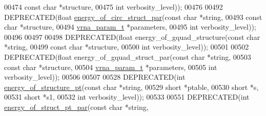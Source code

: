 \begin{DoxyCode}
00474                                           \textcolor{keyword}{const} \textcolor{keywordtype}{char}  *structure,
00475                                           \textcolor{keywordtype}{int}         verbosity\_level));
00476 
00492 DEPRECATED(\textcolor{keywordtype}{float} \hyperlink{group__eval_ga3f01f9744ba6a40555eb4d81fc77f6df}{energy\_of\_circ\_struct\_par}(\textcolor{keyword}{const} \textcolor{keywordtype}{char}   *\textcolor{keywordtype}{string},
00493                                            \textcolor{keyword}{const} \textcolor{keywordtype}{char}   *structure,
00494                                            \hyperlink{group__energy__parameters_structvrna__param__s}{vrna\_param\_t} *parameters,
00495                                            \textcolor{keywordtype}{int}          verbosity\_level));
00496 
00497 
00498 DEPRECATED(\textcolor{keywordtype}{float} energy\_of\_gquad\_structure(\textcolor{keyword}{const} \textcolor{keywordtype}{char} *\textcolor{keywordtype}{string},
00499                                            \textcolor{keyword}{const} \textcolor{keywordtype}{char} *structure,
00500                                            \textcolor{keywordtype}{int}        verbosity\_level));
00501 
00502 DEPRECATED(\textcolor{keywordtype}{float} energy\_of\_gquad\_struct\_par(\textcolor{keyword}{const} \textcolor{keywordtype}{char}    *\textcolor{keywordtype}{string},
00503                                             \textcolor{keyword}{const} \textcolor{keywordtype}{char}    *structure,
00504                                             \hyperlink{group__energy__parameters_structvrna__param__s}{vrna\_param\_t}  *parameters,
00505                                             \textcolor{keywordtype}{int}           verbosity\_level));
00506 
00507 
00528 DEPRECATED(\textcolor{keywordtype}{int} \hyperlink{group__eval_ga8831445966b761417e713360791299d8}{energy\_of\_structure\_pt}(\textcolor{keyword}{const} \textcolor{keywordtype}{char}  *\textcolor{keywordtype}{string},
00529                                       \textcolor{keywordtype}{short}       *ptable,
00530                                       \textcolor{keywordtype}{short}       *s,
00531                                       \textcolor{keywordtype}{short}       *s1,
00532                                       \textcolor{keywordtype}{int}         verbosity\_level));
00533 
00551 DEPRECATED(\textcolor{keywordtype}{int} \hyperlink{group__eval_ga49acb3d5627dc6823a7ce12d116d4c69}{energy\_of\_struct\_pt\_par}(\textcolor{keyword}{const} \textcolor{keywordtype}{char}   *\textcolor{keywordtype}{string},

\end{DoxyCode}
